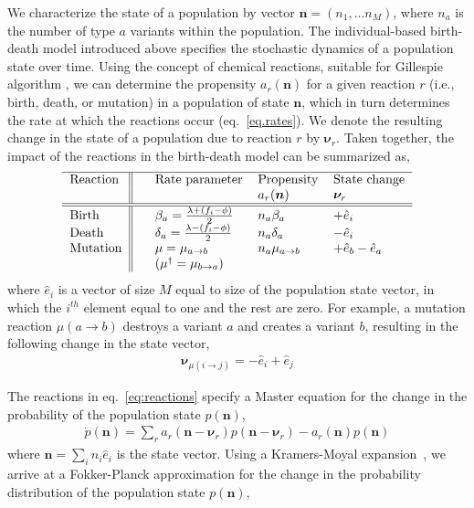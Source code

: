 \documentclass[11pt]{article}
\begin{document}
We characterize the state of a population by vector $\bm{n} = (n_1, \hdots n_M)$, where $n_a$ is the number of type $a$ variants within the population. The individual-based birth-death model introduced above specifies the stochastic dynamics of a population state over time. Using the concept of chemical reactions, suitable for Gillespie algorithm \cite{wilkinsonStochasticModellingSystems2019a, gillespieExactStochasticSimulation1977}, we can determine the propensity $a_r(\bm{n})$ for a given reaction $r$ (i.e., birth, death, or mutation) in a population of state $\bm n$, which in turn determines the rate at which the reactions occur (eq.~\ref{eq.rates}). We denote the resulting change in the state of a population  due to reaction $r$ by  $\bm{\nu}_r$. Taken together, the impact of the reactions in the birth-death model can be summarized as,
\begin{align}
 \begin{tabular}{l | | l l l l}
    \hline
        Reaction & & Rate parameter& Propensity  & State change  \\
        			&&				&  $a_r(\bm{n})$ & $\bm{\nu}_r$\\ \hline \hline
    Birth & & $\beta_a = \frac{\lambda + (f_i - \phi)}{2}$  &  $n_a\beta_a$& $ +\hat{e}_i$  \\ 
   Death & & $\delta_a = \frac{\lambda - (f_i - \phi)}{2}$&  $n_a \delta_a$ & $ -\hat{e}_i$ \\ 
 Mutation & & $\mu = \mu_{a\to b} $  &  $n_a \mu_{a\to b}$ & $+\hat{e}_b - \hat{e}_a$ \\ 
   && $(\mu^\dagger = \mu_{b \to a})$ & 			& 
            \end{tabular}
\label{eq:reactions}
            \end{align}
where $\hat{e}_i$ is a vector of size $M$ equal to size of  the population state vector, in which the $i^{th}$ element equal to one and the rest are zero. For example, 
a mutation reaction $\mu(a\to b)$ destroys a variant $a$ and creates a variant $b$, resulting in the following change in the state vector,
\begin{align}
    \bm{\nu}_{\mu(i\rightarrow j)} = - \hat{e}_i + \hat{e}_j 
\end{align}

The reactions in eq.~\ref{eq:reactions} specify a Master equation for the change in the probability of the population state $p(\bm n)$,%
\begin{align}
    \dot{p}(\bm{n}) = \sum_r a_r(\bm{n} - \bm{\nu}_r) p(\bm{n}- \bm{\nu}_r) - a_r(\bm{n}) p(\bm{n})
\end{align}
where $\bm{n} = \sum_i n_i \hat{e}_i$ is the state vector. Using a Kramers-Moyal expansion~\cite{riskenFokkerPlanckEquationMethods1996}, we arrive at a Fokker-Planck approximation for the change in the probability distribution of the population state $p(\bm n)$,
\end{document}
